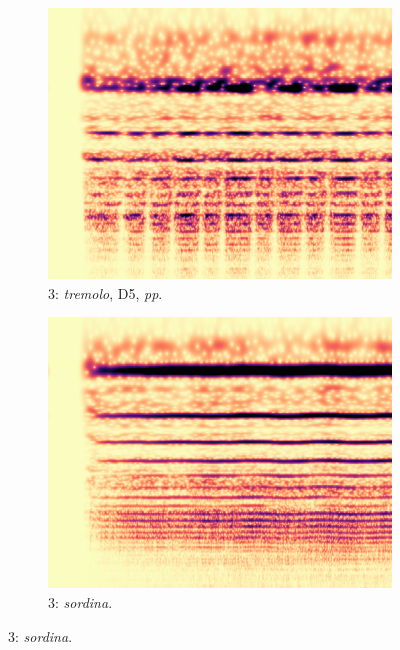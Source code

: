 \begin{figure}
        \begin{subfigure}{0.20\textwidth}
                \centering
                \includegraphics[width=\linewidth]{./figs/demo/Vn-trem-D5-pp-4c.png}
                \caption*{3: \emph{tremolo}, D5, \emph{pp}.}
                \label{fig:Vn-trem-D5-pp-4c}
        \end{subfigure}%
        \begin{subfigure}{0.20\textwidth}
                \centering
                \includegraphics[width=\linewidth]{./figs/demo/Vn+S-ord-G4-mf-4c.png}
                \caption*{3: \emph{sordina}.}
                \label{fig:Vn+S-ord-G4-mf-4c}
        \end{subfigure}%


\end{figure}
